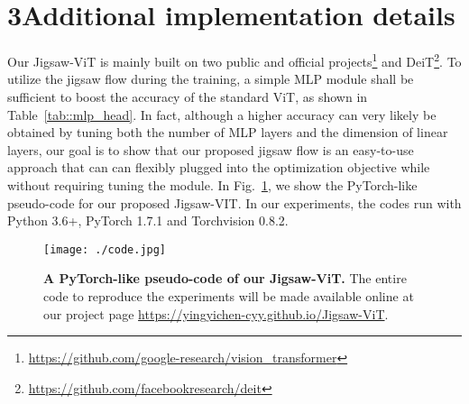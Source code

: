 \documentclass{article}
\begin{document}
\section*{3\quad Additional implementation details}
Our Jigsaw-ViT is mainly built on two public and official projects\footnote{\url{https://github.com/google-research/vision\_transformer}} and DeiT\footnote{\url{https://github.com/facebookresearch/deit}}.
To utilize the jigsaw flow during the training, a simple MLP module shall be sufficient to boost the accuracy of the standard ViT, as shown in Table~\ref{tab::mlp_head}.
In fact, although a higher accuracy can very likely be obtained by tuning both the number of MLP layers and the dimension of linear layers, our goal is to show that our proposed jigsaw flow is an easy-to-use approach that can can flexibly plugged into the optimization objective while without requiring tuning the module. 
In Fig.~\ref{fig::code}, we show the PyTorch-like pseudo-code for our proposed Jigsaw-VIT. In our experiments, the codes run with Python 3.6+, PyTorch 1.7.1 and Torchvision 0.8.2. 


\captionsetup[table]{farskip=2pt,captionskip=1pt,aboveskip=4pt}
    \begin{table}[t]
    \renewcommand{\arraystretch}{1.1}
    \begin{center}
    \caption{\textbf{The details of the Jigsaw MLP head.}  is the dimension of a token embedding, and   refers to the number of outputs, i.e., the number of patches in the input image.}
        \label{tab::mlp_head}
    \end{center}
    \end{table}
    
\begin{figure}[t]
	\centering    
	{\texttt{[image: ./code.jpg]}}\hfill
	\caption{\textbf{A PyTorch-like pseudo-code of our Jigsaw-ViT.} The entire code to reproduce the experiments will be made available online at our project page \url{https://yingyichen-cyy.github.io/Jigsaw-ViT}.}
	\label{fig::code}
\end{figure}
\end{document}
